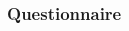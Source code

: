 \documentclass[11pt]{beamer}
\begin{document}
	\begin{frame}
		\frametitle{Questionnaire}
		\begin{columns}
			\begin{column}{0.5\textwidth}
				\begin{center}
				\end{center}
			\end{column}
			\begin{column}{0.5\textwidth}
				\begin{center}

\end{center}
\end{column}
\end{columns}
\end{frame}
\end{document}
